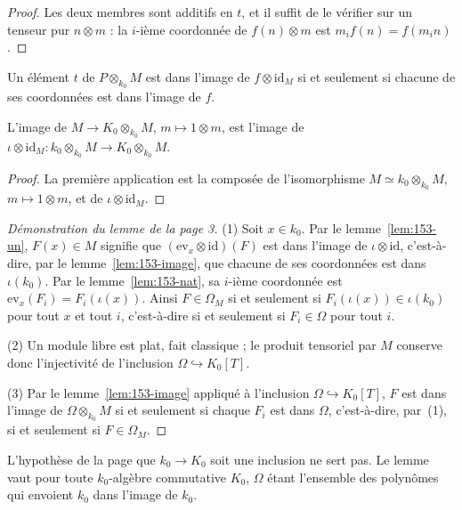 \begin{proof}
Les deux membres sont additifs en $t$, et il suffit de le vérifier sur un tenseur pur $n \otimes m$ : la $i$-ième coordonnée de $f(n) \otimes m$ est $m_i f(n) = f(m_i n)$.
\end{proof}

\begin{lemme}\label{lem:153-image}
Un élément $t$ de $P \otimes_{k_0} M$ est dans l'image de $f \otimes \mathrm{id}_M$ si et seulement si chacune de ses coordonnées est dans l'image de $f$.
\end{lemme}


\begin{lemme}\label{lem:153-un}
L'image de $M \to K_0 \otimes_{k_0} M$, $m \mapsto 1 \otimes m$, est l'image de $\iota \otimes \mathrm{id}_M : k_0 \otimes_{k_0} M \to K_0 \otimes_{k_0} M$.
\end{lemme}

\begin{proof}
La première application est la composée de l'isomorphisme $M \simeq k_0 \otimes_{k_0} M$, $m \mapsto 1 \otimes m$, et de $\iota \otimes \mathrm{id}_M$.
\end{proof}

\begin{proof}[Démonstration du lemme de la page 3]
(1) Soit $x \in k_0$. Par le lemme~\ref{lem:153-un}, $F(x) \in M$ signifie que $(\mathrm{ev}_x \otimes \mathrm{id})(F)$ est dans l'image de $\iota \otimes \mathrm{id}$, c'est-à-dire, par le lemme~\ref{lem:153-image}, que chacune de ses coordonnées est dans $\iota(k_0)$. Par le lemme~\ref{lem:153-nat}, sa $i$-ième coordonnée est $\mathrm{ev}_x(F_i) = F_i(\iota(x))$. Ainsi $F \in \Omega_M$ si et seulement si $F_i(\iota(x)) \in \iota(k_0)$ pour tout $x$ et tout $i$, c'est-à-dire si et seulement si $F_i \in \Omega$ pour tout $i$.

(2) Un module libre est plat, fait classique ; le produit tensoriel par $M$ conserve donc l'injectivité de l'inclusion $\Omega \hookrightarrow K_0[T]$.

(3) Par le lemme~\ref{lem:153-image} appliqué à l'inclusion $\Omega \hookrightarrow K_0[T]$, $F$ est dans l'image de $\Omega \otimes_{k_0} M$ si et seulement si chaque $F_i$ est dans $\Omega$, c'est-à-dire, par~(1), si et seulement si $F \in \Omega_M$.
\end{proof}

\begin{remarque}
L'hypothèse de la page que $k_0 \to K_0$ soit une inclusion ne sert pas. Le lemme vaut pour toute $k_0$-algèbre commutative $K_0$, $\Omega$ étant l'ensemble des polynômes qui envoient $k_0$ dans l'image de $k_0$.
\end{remarque}

